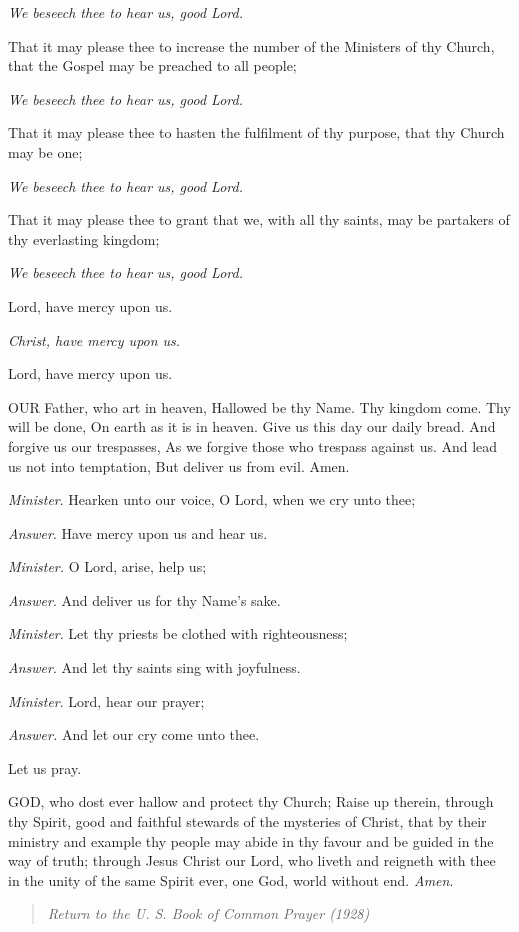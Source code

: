 \emph{We beseech thee to hear us, good Lord.}

That it may please thee to increase the number
of the Ministers of thy Church, that the Gospel may be preached to all
people;

\emph{We beseech thee to hear us, good Lord.}

That it may please thee to hasten the fulfilment
of thy purpose, that thy Church may be one;

\emph{We beseech thee to hear us, good Lord.}

That it may please thee to grant that we, with
all thy saints, may be partakers of thy everlasting kingdom;

\emph{We beseech thee to hear us, good Lord.}

Lord, have mercy upon us.

\emph{Christ, have mercy upon us.}

Lord, have mercy upon us.

OUR Father, who art in
heaven, Hallowed be thy Name. Thy kingdom come. Thy will be done, On earth
as it is in heaven. Give us this day our daily bread. And forgive us our
trespasses, As we forgive those who trespass against us. And lead us not
into temptation, But deliver us from evil. Amen.

\emph{Minister}. Hearken unto
our voice, O Lord, when we cry unto thee; 

\emph{Answer}. Have mercy upon us and hear us.

\emph{Minister.} O Lord, arise, help us;

\emph{Answer}. And deliver us for thy Name's sake.

\emph{Minister}. Let thy priests be clothed
with righteousness;

\emph{Answer}. And let thy saints sing with joyfulness.

\emph{Minister}. Lord, hear our prayer;

\emph{Answer.} And let our cry come unto thee.

Let us pray.

GOD,
who dost ever hallow and protect thy Church; Raise up therein, through
thy Spirit, good and faithful stewards of the mysteries of Christ, that
by their ministry and example thy people may abide in thy favour and be
guided in the way of truth; through Jesus Christ our Lord, who liveth
and reigneth with thee in the unity of the same Spirit ever, one God,
world without end. \emph{Amen}. 

\begin{quote}

\emph{Return to the U.
S. Book of Common Prayer (1928)}

\end{quote}


